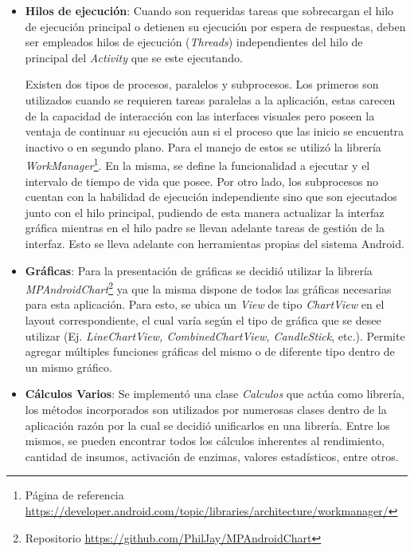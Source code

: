 \begin{itemize}
        \item \textbf{Hilos de ejecución}: Cuando son requeridas tareas que sobrecargan el hilo de ejecución principal o detienen su ejecución por espera de respuestas, deben ser empleados hilos de ejecución (\textit{Threads}) independientes del hilo de principal del \textit{Activity} que se este ejecutando.
        
        \par Existen dos tipos de procesos, paralelos y subprocesos. Los primeros son utilizados cuando se requieren tareas paralelas a la aplicación, estas carecen de la capacidad de interacción con las interfaces visuales pero poseen la ventaja de continuar su ejecución aun si el proceso que las inicio se encuentra inactivo o en segundo plano. Para el manejo de estos se utilizó la librería \textit{WorkManager}\footnote{Página de referencia \url{https://developer.android.com/topic/libraries/architecture/workmanager/}}. En la misma, se define la funcionalidad a ejecutar y el intervalo de tiempo de vida que posee. Por otro lado, los subprocesos no cuentan con la habilidad de ejecución independiente sino que son ejecutados junto con el hilo principal, pudiendo de esta manera actualizar la interfaz gráfica mientras en el hilo padre se llevan adelante tareas de gestión de la interfaz. Esto se lleva adelante con herramientas propias del sistema Android.
        
        \item \textbf{Gráficas}: Para la presentación de gráficas se decidió utilizar la librería \textit{MPAndroidChart}\footnote{Repositorio \url{https://github.com/PhilJay/MPAndroidChart}} ya que la misma dispone de todos las gráficas necesarias para esta aplicación. Para esto, se ubica un \textit{View} de tipo \textit{ChartView} en el layout correspondiente, el cual varía según el tipo de gráfica que se desee utilizar (Ej. \textit{LineChartView, CombinedChartView, CandleStick}, etc.). Permite agregar múltiples funciones gráficas del mismo o de diferente tipo dentro de un mismo gráfico.
        
        \item \textbf{Cálculos Varios}: Se implementó una clase \textit{Calculos} que actúa como librería, los métodos incorporados son utilizados por numerosas clases dentro de la aplicación razón por la cual se decidió unificarlos en una librería. Entre los mismos, se pueden encontrar todos los cálculos inherentes al rendimiento, cantidad de insumos, activación de enzimas, valores estadísticos, entre otros.
     \end{itemize}
    
